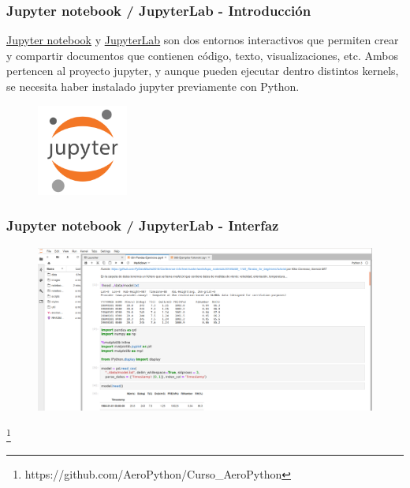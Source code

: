 \documentclass[18pt]{beamer}
\newcommand\blfootnote[1]{%
  \begingroup
  \renewcommand\thefootnote{}\footnote{#1}%
  \addtocounter{footnote}{-1}%
  \endgroup
}
\begin{document}
\begin{frame}

	\frametitle{Jupyter notebook / JupyterLab - Introducción}

	\href{https://jupyter-notebook.readthedocs.io/en/stable/}{Jupyter 
	notebook} y  
	\href{https://jupyterlab.readthedocs.io/en/latest/}{JupyterLab} 
	son dos entornos interactivos que permiten crear y compartir documentos 
	que contienen código, texto, visualizaciones, etc.
	Ambos pertencen al proyecto jupyter, y aunque pueden ejecutar dentro 
	distintos kernels, se necesita haber instalado jupyter previamente con Python. 
	
	\vspace{0.4cm}
	
	\begin{figure}
		\includegraphics[width=3.0cm]{images/jupyter.png}
	\end{figure}

\end{frame}


\begin{frame}
	
	\frametitle{Jupyter notebook / JupyterLab - Interfaz}

	\begin{figure}
		\includegraphics[scale=0.18]{images/prototipar.png}
	\end{figure}

	\blfootnote{\scriptsize https://github.com/AeroPython/Curso\_AeroPython}
	
\end{frame}
\end{document}

